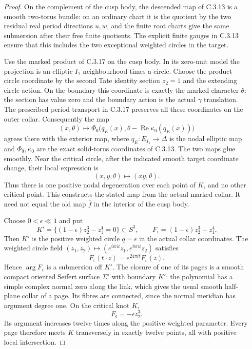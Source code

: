 \begin{proof}
On the complement of the cusp body, the descended map of C.3.13
is a smooth two-torus bundle: on an ordinary chart it is the
quotient by the two residual real period directions $u,w$,
and the finite root charts give the same submersion after their
free finite quotients. The explicit finite gauges in C.3.13
ensure that this includes the two exceptional weighted circles
in the target.

Use the marked product of C.3.17 on the cusp body. In its
zero-unit model the projection is an elliptic $I_1$ neighbourhood
times a circle. Choose the product circle coordinate by the
second Tate identity section $z_2=1$ and the extending circle
action. On the boundary this coordinate is exactly the marked
character $\theta$: the section has value zero and the boundary
action is the actual $\gamma$ translation. The prescribed period
transport in C.3.17 preserves all these coordinates on the
outer collar. Consequently the map
\[
 (x,\theta)\longmapsto
 \Phi_0\bigl(q_E(x),\theta-\operatorname{Re}\kappa_0(q_E(x))\bigr)
\]
agrees there with the exterior map, where $q_E:E_{I_1}\to\Delta$
is the nodal elliptic map and $\Phi_0,\kappa_0$ are the exact
solid-torus coordinates of C.3.13. The two maps glue smoothly.
Near the critical circle, after the indicated smooth target
coordinate change, their local expression is
\[
 (x,y,\theta)\longmapsto(xy,\theta).
\]
Thus there is one positive nodal degeneration over each point
of $K$, and no other critical point. This constructs the stated
map from the actual marked collar. It need not equal the old
map $\overline f$ in the interior of the cusp body.

Choose $0<\epsilon\ll1$ and put
\[
 K'=\{(1-\epsilon)z_2^3-z_1^4=0\}\subset S^3,
 \qquad F_\epsilon=(1-\epsilon)z_2^3-z_1^4.
\]
Then $K'$ is the positive weighted circle $q=\epsilon$ in
the actual collar coordinates. The weighted circle field
$(z_1,z_2)\mapsto(e^{6\pi it}z_1,e^{8\pi it}z_2)$ satisfies
\[
 F_\epsilon(t\cdot z)=e^{24\pi it}F_\epsilon(z).
\]
Hence $\arg F_\epsilon$ is a submersion off $K'$. The closure
of one of its pages is a smooth compact oriented Seifert
surface $\Sigma'$ with boundary $K'$: the polynomial has a
simple complex normal zero along the link, which gives the
usual smooth half-plane collar of a page. Its fibres are
connected, since the normal meridian has argument degree one.
On the critical knot $K$,
\[
 F_\epsilon=-\epsilon z_2^3.
\]
Its argument increases twelve times along the positive weighted
parameter. Every page therefore meets $K$ transversely in
exactly twelve points, all with positive local intersection.


\end{proof}
